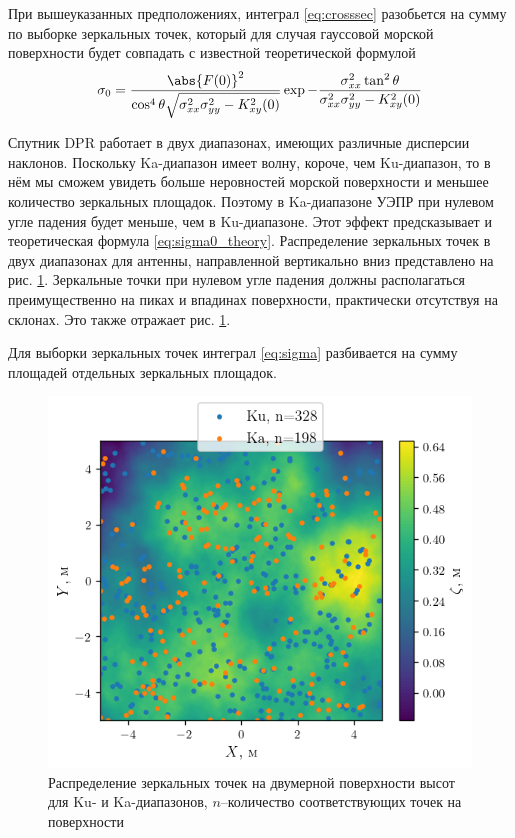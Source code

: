 При вышеуказанных предположениях, интеграл \eqref{eq:crosssec} разобьется на
сумму по выборке зеркальных точек, который для случая гауссовой морской
поверхности будет совпадать с известной теоретической формулой
\begin{equation}
    \label{eq:sigma0_theory}
    \sigma_0 = \frac{\abs{F(0)}^2}{\cos^4\theta \sqrt{\sigma_{xx}^2
    \sigma_{yy}^2 - K_{xy}^2(0)}} \exp{- \frac{\sigma^2_{xx}
    \tan^2\theta}{\sigma_{xx}^2 \sigma_{yy}^2 - K_{xy}^2(0)}}
\end{equation}

Спутник DPR работает в двух диапазонах, имеющих различные дисперсии наклонов.
Поскольку Ka-диапазон имеет волну, короче, чем Ku-диапазон, то в нём мы сможем
увидеть больше неровностей морской поверхности и меньшее количество зеркальных
площадок. Поэтому в Ka-диапазоне УЭПР при нулевом угле падения будет меньше,
чем в Ku-диапазоне.  Этот эффект предсказывает и теоретическая формула
\eqref{eq:sigma0_theory}. 
Распределение зеркальных точек в двух диапазонах для антенны, направленной
вертикально вниз представлено на рис. \ref{fig:mirror_dots_distrib}. 
Зеркальные точки при нулевом угле падения должны располагаться преимущественно
на пиках и впадинах поверхности, практически отсутствуя на склонах. Это также
отражает рис. \ref{fig:mirror_dots_distrib}.

Для выборки зеркальных точек  интеграл \eqref{eq:sigma} разбивается на сумму
площадей отдельных зеркальных площадок. 






\begin{figure}[h]
    \centering
    \includegraphics[width=0.6\linewidth]{figs/mirrordots.png}
    \caption{Распределение зеркальных точек на двумерной поверхности высот для
    Ku- и Ka-диапазонов, $n$--количество соответствующих точек на поверхности }
    \label{fig:mirror_dots_distrib}
\end{figure}

